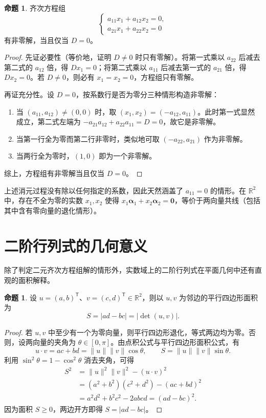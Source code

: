 \documentclass[UTF8, fontset=fandol, a4paper, 12pt]{ctexart}
\newcommand{\R}{\mathbb{R}}
\theoremstyle{definition}
\newtheorem{proposition}[definition]{命题}
\begin{document}
\begin{proposition}
齐次方程组
\[
\begin{cases}a_{11}x_1+a_{12}x_2=0,\\a_{21}x_1+a_{22}x_2=0\end{cases}
\]
有非零解，当且仅当 $D=0$。
\end{proposition}
\begin{proof}
先证必要性（等价地，证明 $D\ne0$ 时只有零解）。将第一式乘以 $a_{22}$ 后减去第二式的 $a_{12}$ 倍，得 $Dx_1=0$；将第二式乘以 $a_{11}$ 后减去第一式的 $a_{21}$ 倍，得 $Dx_2=0$。若 $D\ne0$，则必有 $x_1=x_2=0$，方程组只有零解。

再证充分性。设 $D=0$，按系数行是否为零分三种情形构造非零解：
\begin{enumerate}
\item 当 $(a_{11},a_{12})\ne(0,0)$ 时，取 $(x_1,x_2)=(-a_{12},a_{11})$。此时第一式显然成立，第二式左端为 $-a_{21}a_{12}+a_{22}a_{11}=D=0$，故它是非零解。
\item 当第一行全为零而第二行非零时，类似地可取 $(-a_{22},a_{21})$ 作为非零解。
\item 当两行全为零时，$(1,0)$ 即为一个非零解。
\end{enumerate}
综上，方程组有非零解当且仅当 $D=0$。
\end{proof}

上述消元过程没有除以任何指定的系数，因此天然涵盖了 $a_{11}=0$ 的情形。在 $\R^2$ 中，存在不全为零的实数 $x_1,x_2$ 使得 $x_1\boldsymbol\alpha_1+x_2\boldsymbol\alpha_2=\boldsymbol0$，等价于两向量共线（包括其中含有零向量的退化情形）。

\section{二阶行列式的几何意义}

除了判定二元齐次方程组解的情形外，实数域上的二阶行列式在平面几何中还有直观的面积解释。

\begin{proposition}
设 $u=(a,b)^{\mathsf T}$、$v=(c,d)^{\mathsf T}\in\R^2$，则以 $u,v$ 为邻边的平行四边形面积为
\[
S=|ad-bc|=|\det(u,v)|.
\]
\end{proposition}
\begin{proof}
若 $u,v$ 中至少有一个为零向量，则平行四边形退化，等式两边均为零。否则，设两向量的夹角为 $\theta\in[0,\pi]$。由点积公式与平行四边形面积公式，有
\[
u\cdot v=ac+bd=\|u\|\|v\|\cos\theta,\qquad
S=\|u\|\|v\|\sin\theta.
\]
利用 $\sin^2\theta=1-\cos^2\theta$ 消去夹角，可得
\begin{align*}
S^2
&=\|u\|^2\|v\|^2-(u\cdot v)^2\\
&=(a^2+b^2)(c^2+d^2)-(ac+bd)^2\\
&=a^2d^2+b^2c^2-2abcd=(ad-bc)^2.
\end{align*}
因为面积 $S\ge0$，两边开方即得 $S=|ad-bc|$。
\end{proof}
\end{document}
